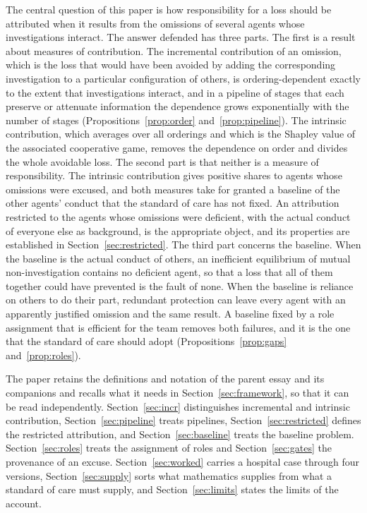\documentclass[11pt]{article}
\theoremstyle{plain}
\theoremstyle{definition}
\begin{document}
The central question of this paper is how responsibility for a loss should be attributed when it results from the omissions of several agents whose investigations interact. The answer defended has three parts. The first is a result about measures of contribution. The incremental contribution of an omission, which is the loss that would have been avoided by adding the corresponding investigation to a particular configuration of others, is ordering-dependent exactly to the extent that investigations interact, and in a pipeline of stages that each preserve or attenuate information the dependence grows exponentially with the number of stages (Propositions~\ref{prop:order} and~\ref{prop:pipeline}). The intrinsic contribution, which averages over all orderings and which is the Shapley value of the associated cooperative game, removes the dependence on order and divides the whole avoidable loss. The second part is that neither is a measure of responsibility. The intrinsic contribution gives positive shares to agents whose omissions were excused, and both measures take for granted a baseline of the other agents' conduct that the standard of care has not fixed. An attribution restricted to the agents whose omissions were deficient, with the actual conduct of everyone else as background, is the appropriate object, and its properties are established in Section~\ref{sec:restricted}. The third part concerns the baseline. When the baseline is the actual conduct of others, an inefficient equilibrium of mutual non-investigation contains no deficient agent, so that a loss that all of them together could have prevented is the fault of none. When the baseline is reliance on others to do their part, redundant protection can leave every agent with an apparently justified omission and the same result. A baseline fixed by a role assignment that is efficient for the team removes both failures, and it is the one that the standard of care should adopt (Propositions~\ref{prop:gaps} and~\ref{prop:roles}).

The paper retains the definitions and notation of the parent essay and its companions and recalls what it needs in Section~\ref{sec:framework}, so that it can be read independently. Section~\ref{sec:incr} distinguishes incremental and intrinsic contribution, Section~\ref{sec:pipeline} treats pipelines, Section~\ref{sec:restricted} defines the restricted attribution, and Section~\ref{sec:baseline} treats the baseline problem. Section~\ref{sec:roles} treats the assignment of roles and Section~\ref{sec:gates} the provenance of an excuse. Section~\ref{sec:worked} carries a hospital case through four versions, Section~\ref{sec:supply} sorts what mathematics supplies from what a standard of care must supply, and Section~\ref{sec:limits} states the limits of the account.
\end{document}
